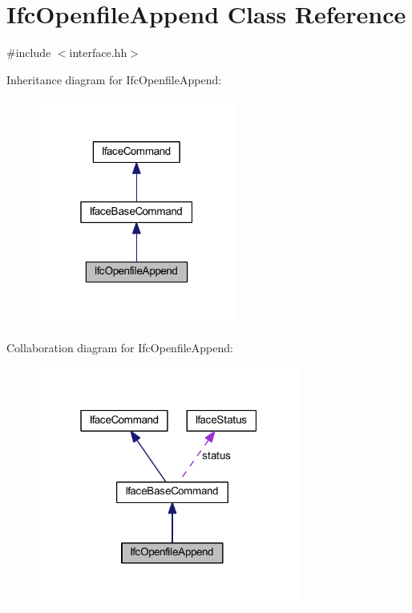 \hypertarget{class_ifc_openfile_append}{}\section{Ifc\+Openfile\+Append Class Reference}
\label{class_ifc_openfile_append}


{\ttfamily \#include $<$interface.\+hh$>$}



Inheritance diagram for Ifc\+Openfile\+Append\+:
\nopagebreak
\begin{figure}[H]
\begin{center}
\leavevmode
\includegraphics[width=184pt]{class_ifc_openfile_append__inherit__graph}
\end{center}
\end{figure}


Collaboration diagram for Ifc\+Openfile\+Append\+:
\nopagebreak
\begin{figure}[H]
\begin{center}
\leavevmode
\includegraphics[width=244pt]{class_ifc_openfile_append__coll__graph}
\end{center}
\end{figure}
